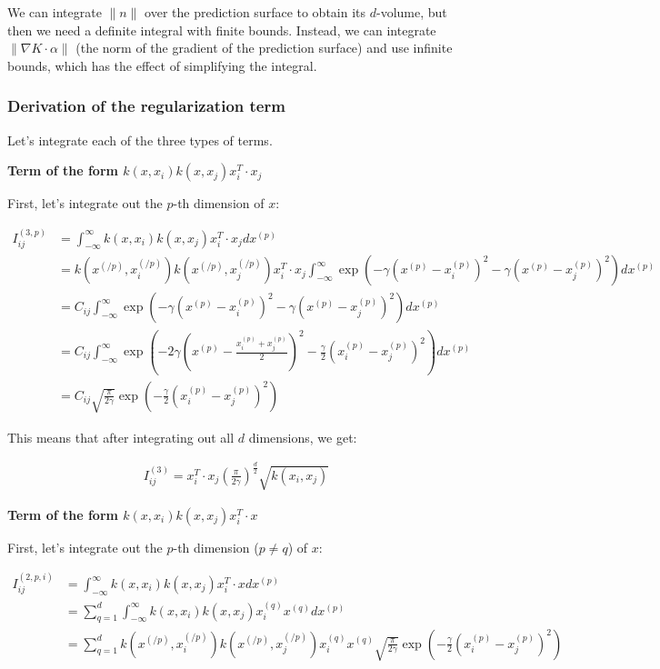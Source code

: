 \documentclass[12pt]{article}
\begin{document}
We can integrate $\|n\|$ over the prediction surface to obtain its $d$-volume, but then we need a definite integral with finite bounds. Instead, we can integrate $\|\nabla K \cdot \alpha\|$ (the norm of the gradient of the prediction surface) and use infinite bounds, which has the effect of simplifying the integral.

\subsubsection{Derivation of the regularization term}

Let's integrate each of the three types of terms.

\textbf{Term of the form $k(x,x_i)k(x,x_j)x_i^T\cdot x_j$}

First, let's integrate out the $p$-th dimension of $x$:

\begin{align}
I^{(3,p)}_{ij} &= \int_{-\infty}^\infty k(x,x_i)k(x,x_j)x_i^T\cdot x_j dx^{(p)}\\
&= k(x^{(/p)}, x_i^{(/p)}) k(x^{(/p)}, x_j^{(/p)})x_i^T\cdot x_j  \int_{-\infty}^\infty \exp(-\gamma (x^{(p)} - x_i^{(p)})^2-\gamma (x^{(p)} - x_j^{(p)})^2) dx^{(p)}\\
&= C_{ij} \int_{-\infty}^\infty \exp(-\gamma (x^{(p)} - x_i^{(p)})^2-\gamma (x^{(p)} - x_j^{(p)})^2) dx^{(p)}\\
&= C_{ij} \int_{-\infty}^\infty \exp\left(-2\gamma\left(x^{(p)} - \frac{x_i^{(p)}+x_j^{(p)}}{2}\right)^2 - 
\frac{\gamma}{2}\left(x_i^{(p)} - x_j^{(p)}\right)^2\right) dx^{(p)}\\
&= C_{ij} \sqrt{\frac{\pi}{2 \gamma}} \exp\left(- 
\frac{\gamma}{2}\left(x_i^{(p)} - x_j^{(p)}\right)^2\right)
\end{align}

This means that after integrating out all $d$ dimensions, we get:

\begin{align}
I_{ij}^{(3)} = x_i^T\cdot x_j\left(\frac{\pi}{2\gamma}\right)^{\frac{d}{2}}\sqrt{k(x_i,x_j)}
\end{align}

\textbf{Term of the form $k(x,x_i)k(x,x_j)x_i^T\cdot x$}

First, let's integrate out the $p$-th dimension ($p \ne q$) of $x$:

\begin{align}
I^{(2,p,i)}_{ij} &= \int_{-\infty}^\infty k(x,x_i)k(x,x_j)x_i^T\cdot x dx^{(p)}\\
&= \sum_{q=1}^d\int_{-\infty}^\infty k(x,x_i)k(x,x_j)x_{i}^{(q)} x^{(q)} dx^{(p)}\\
&= \sum_{q=1}^d  k(x^{(/p)}, x_i^{(/p)}) k(x^{(/p)}, x_j^{(/p)}) x_{i}^{(q)} x^{(q)} \sqrt{\frac{\pi}{2 \gamma}} \exp\left(- 
\frac{\gamma}{2}\left(x_i^{(p)} - x_j^{(p)}\right)^2\right)
\end{align}
\end{document}
